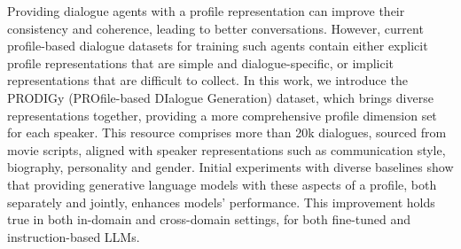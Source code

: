 Providing dialogue agents with a profile representation can improve their consistency and coherence, leading to better conversations. However, current profile-based dialogue datasets for training such agents contain either explicit profile representations that are simple and dialogue-specific, or implicit representations that are difficult to collect. In this work, we introduce the PRODIGy (PROfile-based DIalogue Generation) dataset, which brings diverse representations together, providing a more comprehensive profile dimension set for each speaker. This resource comprises more than 20k dialogues, sourced from movie scripts, aligned with speaker representations such as communication style, biography, personality and gender. Initial experiments with diverse baselines show that providing generative language models with these aspects of a profile, both separately and jointly, enhances models' performance. This improvement holds true in both in-domain and cross-domain settings, for both fine-tuned and instruction-based LLMs.